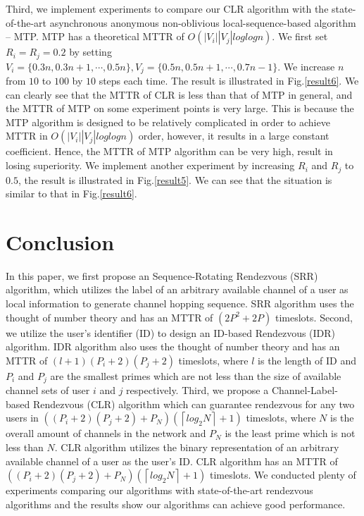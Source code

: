 \documentclass[10pt, conference, letterpaper]{IEEEtran}
\begin{document}
Third, we implement experiments to compare our CLR algorithm with the state-of-the-art asynchronous anonymous non-oblivious local-sequence-based algorithm -- MTP. MTP has a theoretical MTTR of $O(|V_i||V_j|loglogn)$. We first set $R_i = R_j = 0.2$ by setting $V_i = \{0.3n, 0.3n +1,\cdots, 0.5n\}, V_j =\{0.5n, 0.5n + 1,\cdots, 0.7n -1 \}$. We increase $n$ from $10$ to $100$ by $10$ steps each time. The result is illustrated in Fig.\ref{result6}. We can clearly see that the MTTR of CLR is less than that of MTP in general, and the MTTR of MTP on some experiment points is very large. This is because the MTP algorithm is designed to be relatively complicated in order to achieve MTTR in $O(|V_i||V_j|loglogn)$ order, however, it results in a large constant coefficient. Hence, the MTTR of MTP algorithm can be very high, result in losing superiority. We implement another experiment by increasing $R_i$ and $R_j$ to $0.5$, the result is illustrated in Fig.\ref{result5}. We can see that the situation is similar to that in Fig.\ref{result6}.



\section{Conclusion}
In this paper, we first propose an Sequence-Rotating Rendezvous (SRR) algorithm, which utilizes the label of an arbitrary available channel of a user as local information to generate channel hopping sequence. SRR algorithm uses the thought of number theory and has an MTTR of $(2P^2 + 2P)$ timeslots. Second, we utilize the user's identifier (ID) to design an ID-based Rendezvous (IDR) algorithm. IDR algorithm also uses the thought of number theory and has an MTTR of $(l+1)(P_i+2)(P_j+2)$ timeslots, where $l$ is the length of ID and $P_i$ and $P_j$ are the smallest primes which are not less than the size of available channel sets of user $i$ and $j$ respectively. Third, we propose a Channel-Label-based Rendezvous (CLR) algorithm which can guarantee rendezvous for any two users in $((P_i +2)(P_j+2) + P_N)(\left \lceil log_2 N \right \rceil + 1)$ timeslots, where $N$ is the overall amount of channels in the network and $P_N$ is the least prime which is not less than $N$. CLR algorithm utilizes the binary representation of an arbitrary available channel of a user as the user's ID. CLR algorithm has an MTTR of $((P_i + 2)(P_j + 2) +P_N)(\left \lceil log_2 N \right \rceil + 1)$ timeslots. We conducted plenty of experiments comparing our algorithms with state-of-the-art rendezvous algorithms and the results show our algorithms can achieve good performance.



%


\end{document}
